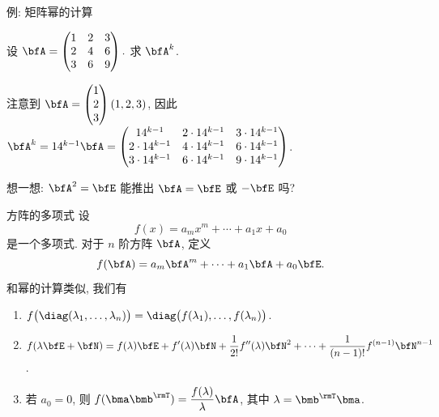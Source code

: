 \begin{frame}{例: 矩阵幂的计算}
	\onslide<+->
	\begin{exercise}
		设 
		$\bfA=\begin{pmatrix}
			1&2&3\\
			2&4&6\\
			3&6&9
		\end{pmatrix}.$
		求 $\bfA^k$.
	\end{exercise}
	\onslide<+->
	\begin{answer}
		注意到 $\bfA=\begin{pmatrix}
			1\\2\\3
		\end{pmatrix}(1,2,3)$, 因此 $\bfA^k=14^{k-1}\bfA=\begin{pmatrix}
			14^{k-1}&2\cdot14^{k-1}&3\cdot14^{k-1}\\
			2\cdot14^{k-1}&4\cdot14^{k-1}&6\cdot14^{k-1}\\
			3\cdot14^{k-1}&6\cdot14^{k-1}&9\cdot14^{k-1}
		\end{pmatrix}$.
	\end{answer}
	\onslide<+->
	想一想: $\bfA^2=\bfE$ 能推出 $\bfA=\bfE$ 或 $-\bfE$ 吗?
\end{frame}


\begin{frame}{方阵的多项式}
	\onslide<+->
	设
	\[f(x)=a_mx^m+\cdots+a_1x+a_0\]
	是一个多项式.
	\onslide<+->
	对于 $n$ 阶方阵 $\bfA$, 定义
	\[f(\bfA)=a_m\bfA^m+\cdots+a_1\bfA+a_0\bfE.\]
	\onslide<+->
	和幂的计算类似, 我们有
	\onslide<+->
	\begin{enumerate}
		\item $\displaystyle
			f\bigl(\diag(\lambda_1,\dots,\lambda_n)\bigr)
			=\diag\bigl(f(\lambda_1),\dots,f(\lambda_n)\bigr)$.
		\item $\displaystyle
			f(\lambda\bfE+\bfN)
			=f(\lambda)\bfE+f'(\lambda)\bfN+\frac1{2!} f''(\lambda)\bfN^2+\cdots+\frac1{(n-1)!}f^{(n-1)}\bfN^{n-1}$.
	\item 若 $a_0=0$, 则 $\displaystyle f(\bma\bmb^\rmT)=\frac{f(\lambda)}{\lambda}\bfA$, 其中 $\lambda=\bmb^\rmT\bma$.
	\end{enumerate}
\end{frame}


